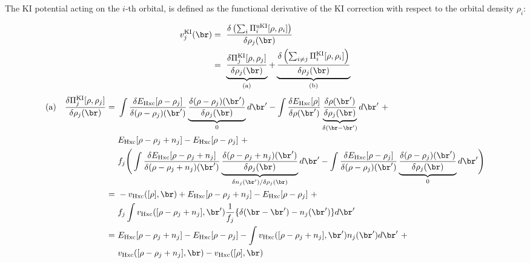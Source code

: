 \clearpage
The KI potential acting on the $i$-th orbital, is defined as the functional derivative of the KI correction with respect to the orbital density $\rho_i$:

\begin{equation}
    \begin{split}
    v^{\rm KI}_j(\br) &=\ \frac{\delta \left( \sum_i \Pi^{\rm uKI}_i[\rho,\rho_i] \right)}{\delta \rho_j(\br)} \\
    &=\ \underbrace{\frac{\delta \Pi^{\rm KI}_j[\rho,\rho_j]}{\delta \rho_j(\br)}}_{(\text{a})} + \underbrace{\frac{\delta \left( \sum_{i \neq j} \Pi^{\rm KI}_i[\rho,\rho_i] \right)}{\delta \rho_j(\br)}}_{(\text{b})}
    \end{split}
    \label{eq:ki-pot-1}
\end{equation}
%
\begin{equation}
    \begin{split}
    \text{(a)} \quad \frac{\delta \Pi^{\rm KI}_j[\rho,\rho_j]}{\delta \rho_j(\br)} =\
    &\int \frac{\delta E_{\rm Hxc}[\rho-\rho_j]}{\delta(\rho-\rho_j)(\br')} \underbrace{\frac{\delta(\rho-\rho_j)(\br')}{\delta\rho_j(\br)}}_{0} d\br' -
    \int \frac{\delta E_{\rm Hxc}[\rho]}{\delta\rho(\br')} \underbrace{\frac{\delta\rho(\br')}{\delta\rho_j(\br)}}_{\delta(\br-\br')} d\br' \ + \\
    &E_{\rm Hxc}[\rho-\rho_j+n_j] - E_{\rm Hxc}[\rho-\rho_j] \ + \\
    &f_j \Bigg( \int \frac{\delta E_{\rm Hxc}[\rho-\rho_j+n_j]}{\delta(\rho-\rho_j+n_j)(\br')} \underbrace{\frac{\delta(\rho-\rho_j+n_j)(\br')}{\delta\rho_j(\br)}}_{\delta n_j(\br')/\delta \rho_j(\br)} d\br' - 
    \int \frac{\delta E_{\rm Hxc}[\rho-\rho_j]}{\delta(\rho-\rho_j)(\br')} \underbrace{\frac{\delta(\rho-\rho_j)(\br')}{\delta\rho_j(\br)}}_{0} d\br' \Bigg) \\
    = \ &- v_{\rm Hxc}([\rho],\br) + E_{\rm Hxc}[\rho-\rho_j+n_j] - E_{\rm Hxc}[\rho-\rho_j] \ + \\
    &f_j \int v_{\rm Hxc}([\rho-\rho_j+n_j],\br') \frac{1}{f_j} \{ \delta(\br-\br') - n_j(\br') \} d\br' \\
    = \ &E_{\rm Hxc}[\rho-\rho_j+n_j] - E_{\rm Hxc}[\rho-\rho_j] - \int v_{\rm Hxc}([\rho-\rho_j+n_j],\br') n_j(\br') d\br' \ + \\
    &v_{\rm Hxc}([\rho-\rho_j+n_j],\br) - v_{\rm Hxc}([\rho],\br)
    \end{split}
    \label{eq:ki-pot-diag-deriv}
\end{equation}
%
